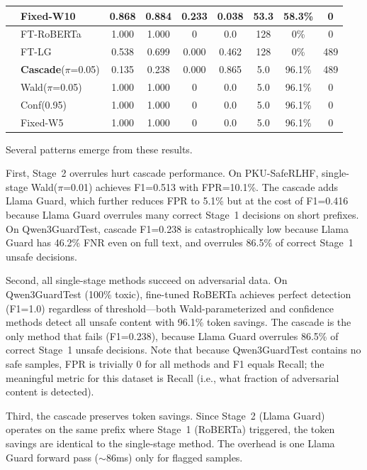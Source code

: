 \documentclass[acmtjournal, acmnowidth]{acmart}
\theoremstyle{definition}
\begin{document}
\begin{table}[h]
\begin{tabular}{llccccccc}
 & Fixed-W10 & 0.868 & 0.884 & 0.233 & 0.038 & 53.3 & 58.3\% & 0 \\
\midrule
{}
 & FT-RoBERTa & 1.000 & 1.000 & 0 & 0.0 & 128 & 0\% & 0 \\
 & FT-LG & 0.538 & 0.699 & 0.000 & 0.462 & 128 & 0\% & 489 \\
 & \textbf{Cascade}($\pi$=0.05) & 0.135 & 0.238 & 0.000 & 0.865 & 5.0 & 96.1\% & 489 \\
 & Wald($\pi$=0.05) & 1.000 & 1.000 & 0 & 0.0 & 5.0 & 96.1\% & 0 \\
 & Conf(0.95) & 1.000 & 1.000 & 0 & 0.0 & 5.0 & 96.1\% & 0 \\
 & Fixed-W5 & 1.000 & 1.000 & 0 & 0.0 & 5.0 & 96.1\% & 0 \\
\bottomrule
\end{tabular}
\end{table}

Several patterns emerge from these results.

First, Stage~2 overrules hurt cascade performance. On PKU-SafeRLHF, single-stage Wald($\pi$=0.01) achieves F1=0.513 with FPR=10.1\%. The cascade adds Llama Guard, which further reduces FPR to 5.1\% but at the cost of F1=0.416 because Llama Guard overrules many correct Stage~1 decisions on short prefixes. On Qwen3GuardTest, cascade F1=0.238 is catastrophically low because Llama Guard has 46.2\% FNR even on full text, and overrules 86.5\% of correct Stage~1 unsafe decisions.

Second, all single-stage methods succeed on adversarial data. On Qwen3GuardTest (100\% toxic), fine-tuned RoBERTa achieves perfect detection (F1=1.0) regardless of threshold---both Wald-parameterized and confidence methods detect all unsafe content with 96.1\% token savings. The cascade is the only method that fails (F1=0.238), because Llama Guard overrules 86.5\% of correct Stage~1 unsafe decisions. Note that because Qwen3GuardTest contains no safe samples, FPR is trivially 0 for all methods and F1 equals Recall; the meaningful metric for this dataset is Recall (i.e., what fraction of adversarial content is detected).

Third, the cascade preserves token savings. Since Stage~2 (Llama Guard) operates on the same prefix where Stage~1 (RoBERTa) triggered, the token savings are identical to the single-stage method. The overhead is one Llama Guard forward pass (${\sim}$86ms) only for flagged samples.
\end{document}
